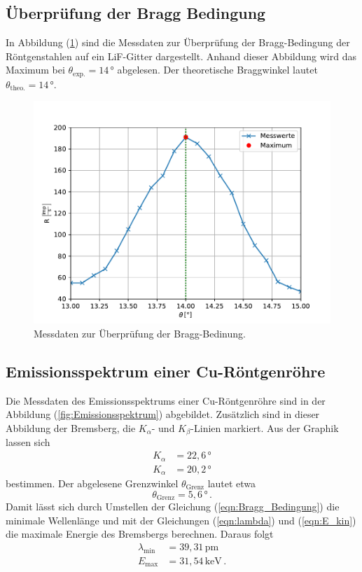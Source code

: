 \subsection{Überprüfung der Bragg Bedingung}
In Abbildung (\ref{fig:Bragg}) sind die Messdaten zur Überprüfung der
Bragg-Bedingung der Röntgenstahlen auf ein LiF-Gitter dargestellt.
Anhand dieser Abbildung wird das Maximum bei $\theta_{\text{exp.}} = 14\,\unit{\degree}$
abgelesen. Der theoretische Braggwinkel lautet $\theta_{\text{theo.}} = 14\,\unit{\degree}$.
\begin{figure}[H]
  \centering
  \includegraphics{content/Plots/Bragg.pdf}
  \caption{Messdaten zur Überprüfung der Bragg-Bedinung.}
  \label{fig:Bragg}
\end{figure}

\subsection{Emissionsspektrum einer Cu-Röntgenröhre}
Die Messdaten des Emissionsspektrums einer Cu-Röntgenröhre sind in der 
Abbildung (\ref{fig:Emissionsspektrum}) abgebildet. Zusätzlich sind in dieser
Abbildung der Bremsberg, die $K_{\alpha}$- und $K_{\beta}$-Linien markiert.
Aus der Graphik lassen sich 
\begin{align*}
  K_{\alpha} &= 22,6\,\unit{\degree} \\
  K_{\alpha} &= 20,2\,\unit{\degree}
\end{align*}
bestimmen. Der abgelesene Grenzwinkel $\theta_{\text{Grenz}}$ lautet etwa
$$\theta_{\text{Grenz}} = 5,6\,\unit{\degree}\,.$$ Damit lässt sich durch Umstellen der Gleichung
(\ref{eqn:Bragg_Bedingung}) die minimale Wellenlänge und mit der Gleichungen (\ref{eqn:lambda}) und (\ref{eqn:E_kin}) die maximale Energie des Bremsbergs
berechnen. Daraus folgt
\begin{align*}
  \lambda_{\text{min}} &= 39,31\,\unit{\pico\metre}\\
  E_{\text{max}} &= 31,54\,\unit{\kilo\eV}\,.
\end{align*}


